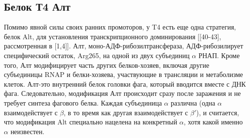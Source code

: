 \documentclass[a4paper,12pt]{article}
\begin{document}
        \subsection{Белок Т4 Алт}
            \par{Помимо явной силы своих ранних промоторов, у T4 есть еще одна стратегия, белок Alt, для установления
            транскрипционного доминирования [[40-43], рассмотренная в [1,4]]. Алт, моно-АДФ-рибозилтрансфераза,
            АДФ-рибозилирует специфический остаток, Arg265, на одной из двух субъединиц \(\alpha\) РНАП. Кроме того, Алт
            модифицирует часть других белков-хозяев, включая другие субъединицы RNAP и белки-хозяева, участвующие в
            трансляции и метаболизме клеток. Алт-это внутренний белок головки фага, который вводится вместе с ДНК фага.
            Следовательно, модификация Алт происходит сразу после заражения и не требует синтеза фагового белка. Каждая
            субъединица \(\alpha\) различна (одна \(\alpha\) взаимодействует с \(\beta\), в то время как другая
            взаимодействует с \(\beta'\)), и считается, что модификация Alt специально нацелена на конкретный \(\alpha\),
            хотя какой именно \(\alpha\) неизвестен.}
\end{document}
